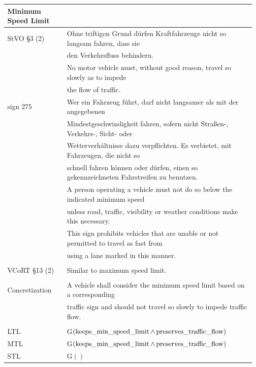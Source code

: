 \begin{table}[H]
	\centering
	\begin{tabular}[t]{ll}
		\toprule
		\textbf{Minimum Speed Limit} &\\
		\midrule
		StVO \S 3 (2)  & Ohne triftigen Grund dürfen Kraftfahrzeuge nicht so langsam fahren, dass sie\\
		& den Verkehrsfluss behindern.\\
		& No motor vehicle must, without good reason, travel so slowly as to impede\\ 
		& the flow of traffic.\\
		sign $275$ &  Wer ein Fahrzeug führt, darf nicht langsamer als mit der angegebenen \\ 
		& Mindestgeschwindigkeit fahren, sofern nicht Straßen-, Verkehrs-, Sicht- oder \\ 
		& Wetterverhältnisse dazu verpflichten. Es verbietet, mit Fahrzeugen, die nicht so \\
		& schnell fahren können oder dürfen, einen so gekennzeichneten Fahrstreifen zu benutzen. \\
		& A person operating a vehicle must not do so below the indicated minimum speed \\ 
		& unless road, traffic, visibility or weather conditions make this necessary.  \\
		& This sign prohibits vehicles that are unable or not permitted to travel as fast from \\
		& using a lane marked in this manner. \\
		&\\
		VCoRT \S 13 (2) &  Similar to maximum speed limit.\\
		&\\
		Concretization & A vehicle shall consider the minimum speed limit based on a corresponding \\
		& traffic sign and should not travel so slowly to impede traffic flow. \\
		&\\
		LTL & G$(\operatorname*{keeps\_min\_speed\_limit} \land \operatorname*{preserves\_traffic\_flow})$\\
		MTL & G$(\operatorname*{keeps\_min\_speed\_limit} \land \operatorname*{preserves\_traffic\_flow})$\\
		STL & G$()$\\
		\bottomrule
	\end{tabular}
\end{table}


